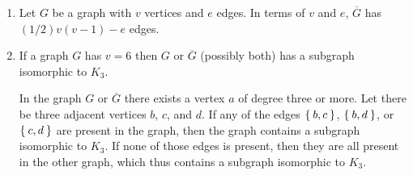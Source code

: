 \documentclass[nobib]{tufte-book}
\begin{document}
\begin{enumerate}
  \item Let $G$ be a graph with $v$ vertices and $e$ edges. In terms of $v$ and
    $e$, $\overline{G}$ has $(1/2)v(v-1) - e$ edges.

    \newpage

  \item \label{ex:9} If a graph $G$ has $v=6$ then $G$ or $\overline{G}$
    (possibly both) has a subgraph isomorphic to $K_{3}$.

    In the graph $G$ or $\overline{G}$ there exists a vertex $a$ of degree three
    or more. Let there be three adjacent vertices $b$, $c$, and $d$. If any of
    the edges $\Set{b,c}$, $\Set{b,d}$, or $\Set{c,d}$ are present in the graph,
    then the graph contains a subgraph isomorphic to $K_{3}$. If none of those
    edges is present, then they are all present in the other graph, which thus
    contains a subgraph isomorphic to $K_{3}$.

    \begin{figure}
    \end{figure}


\end{enumerate}
\end{document}
